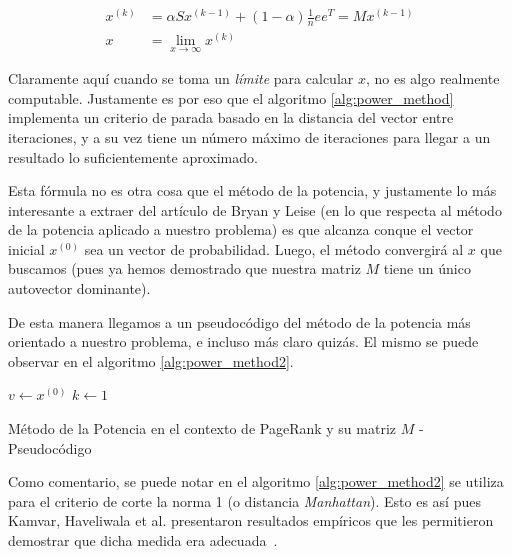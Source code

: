 \begin{align*}
    x^{(k)} &= \alpha Sx^{(k-1)} + (1-\alpha)\frac{1}{n}ee^T = Mx^{(k-1)}\\
    x &= \lim_{x\rightarrow\infty} x^{(k)}
\end{align*}

\par Claramente aqu\'i cuando se toma un \emph{l\'imite} para calcular $x$, no
es algo realmente computable. Justamente es por eso que el algoritmo
\ref{alg:power_method} implementa un criterio de parada basado en la distancia
del vector entre iteraciones, y a su vez tiene un n\'umero m\'aximo de
iteraciones para llegar a un resultado lo suficientemente aproximado.

\par Esta f\'ormula no es otra cosa que el m\'etodo de la potencia, y justamente
lo m\'as interesante a extraer del art\'iculo de Bryan y Leise (en lo que
respecta al m\'etodo de la potencia aplicado a nuestro problema) es que alcanza
conque el vector inicial $x^{(0)}$ sea un vector de probabilidad. Luego, el
m\'etodo convergir\'a al $x$ que buscamos (pues ya hemos demostrado que nuestra
matriz $M$ tiene un \'unico autovector dominante).

\par De esta manera llegamos a un pseudoc\'odigo del m\'etodo de la potencia
m\'as orientado a nuestro problema, e incluso m\'as claro quiz\'as. El mismo se
puede observar en el algoritmo \ref{alg:power_method2}.

\begin{algorithm}
    $v\gets x^{(0)}$\;
    $k\gets 1$\;

    \caption{M\'etodo de la Potencia en el contexto de PageRank y su matriz $M$
    - Pseudoc\'odigo~\cite[p.263]{Kamvar2003}}
    \label{alg:power_method2}
\end{algorithm}

\par Como comentario, se puede notar en el algoritmo \ref{alg:power_method2} se
utiliza para el criterio de corte la norma 1 (o distancia \emph{Manhattan}).
Esto es as\'i pues Kamvar, Haveliwala et al. presentaron resultados emp\'iricos
que les permitieron demostrar que dicha medida era
adecuada~\cite[p.268]{Kamvar2003}.

